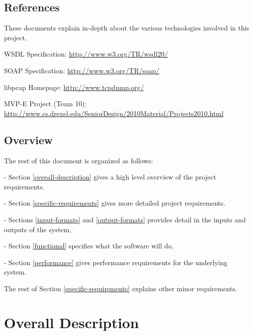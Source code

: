 \documentclass[titlepage]{article}
\begin{document}
\subsection{References%
  \label{references}%
}

These documents explain in-depth about the various technologies involved in this project.
%
\begin{itemize*}
	\item WSDL Specification: \url{http://www.w3.org/TR/wsdl20/}
	\item SOAP Specification: \url{http://www.w3.org/TR/soap/}
	\item libpcap Homepage: \url{http://www.tcpdump.org/}
	\item MVP-E Project (Team 10): \url{http://www.cs.drexel.edu/SeniorDesign/2010Material/Projects2010.html}
\end{itemize*}


\subsection{Overview%
  \label{overview}%
}

The rest of this document is organized as follows: 
\begin{itemize*}
	\item[-]Section \ref{overall-description} gives a high level overview of the project requirements.  
	\item[-]Section \ref{specific-requirements} gives more detailed project requirements.  
	\item[-]Sections \ref{input-formats} and \ref{output-formats} provides detail in the inputs and outputs of the system, 
	\item[-]Section \ref{functional} specifies what the software will do, 
	\item[-]Section \ref{performance} gives performance requirements for the underlying system.
\end{itemize*}
The rest of Section \ref{specific-requirements} explains other minor requirements.



\section{Overall Description%
  \label{overall-description}%
}
\end{document}
